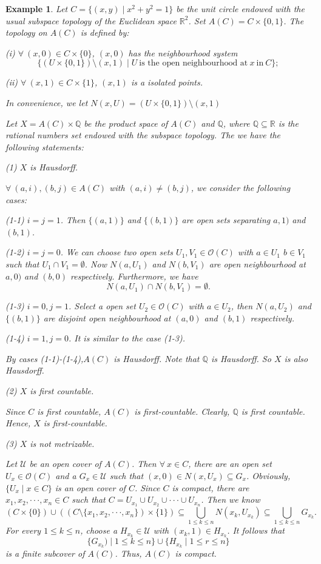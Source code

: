 \documentclass[preprint,12pt]{elsarticle}
\numberwithin{equation}{section}
\newtheorem{example}[theorem]{Example}
\begin{document}
\begin{example} {\rm Let $C=\{(x,y)\mid x^{2}+y^{2}=1\}$ be the unit circle endowed with the usual subspace topology of the Euclidean space $\mathbb{R}^{2}$. Set $A(C)=C\times\{0,1\}$. The topology on $A(C)$ is defined by:

(i) $\forall\ (x,0)\in C\times\{0\}$, $(x,0)$ has the neighbourhood system
$$\{(U\times\{0,1\})\setminus(x,1)\mid U\ \mbox{is the open neighbourhood at}\ x \ \mbox{in}\ C\};$$

(ii) $\forall\ (x,1)\in C\times\{1\}$, $(x,1)$ is a isolated points.

In convenience, we let $N(x,U)=(U\times\{0,1\})\setminus(x,1)$

Let $X=A(C)\times\mathbb{Q}$ be the product space of $A(C)$ and $\mathbb{Q}$, where $\mathbb{Q}\subseteq\mathbb{R}$ is the rational numbers set endowed with the subspace topology. The we have the following statements:

(1) $X$ is Hausdorff.

$\forall\ (a,i),(b,j)\in A(C)$ with $(a,i)\neq(b,j)$, we consider the following cases:

(1-1) $i=j=1$. Then $\{(a,1)\}$ and $\{(b,1)\}$ are open sets separating $a,1)$ and $(b,1)$.

(1-2) $i=j=0$. We can choose two open sets $U_{1},V_{1}\in\mathcal{O}(C)$ with $a\in U_{1}$ $b\in V_{1}$ such that $U_{1}\cap V_{1}=\emptyset$. Now $N(a,U_{1})$ and $N(b,V_{1})$ are open neighbourhood at $a,0)$ and $(b,0)$ respectively. Furthermore, we have $$N(a,U_{1})\cap N(b,V_{1})=\emptyset.$$

(1-3) $i=0,j=1$. Select a open set $U_{2}\in\mathcal{O}(C)$ with $a\in U_{2}$, then $N(a,U_{2})$ and $\{(b,1)\}$ are disjoint open neighbourhood at $(a,0)$ and $(b,1)$ respectively.

(1-4) $i=1,j=0$. It is similar to the case (1-3).

By cases (1-1)-(1-4),$A(C)$ is Hausdorff. Note that $\mathbb{Q}$ is Hausdorff. So $X$ is also Hausdorff.

(2) $X$ is first countable.

Since $C$ is first countable, $A(C)$ is first-countable. Clearly, $\mathbb{Q}$ is first countable. Hence, $X$ is first-countable.

(3) $X$ is not metrizable.

Let $\mathcal{U}$ be an open cover of $A(C)$. Then $\forall\ x\in C$, there are an open set $U_{x}\in\mathcal{O}(C)$ and a $G_{x}\in\mathcal{U}$ such that $(x,0)\in N(x,U_{x})\subseteq G_{x}$. Obviously, $\{U_{x}\mid x\in C\}$ is an open cover of $C$. Since $C$ is compact, there are $x_{1},x_{2},\cdot\cdot\cdot,x_{n}\in C$ such that $C=U_{x_{1}}\cup U_{x_{2}}\cup\cdot\cdot\cdot\cup U_{x_{n}}$. Then we know
$$(C\times\{0\})\cup((C\setminus\{x_{1},x_{2},\cdot\cdot\cdot,x_{n}\})\times\{1\})\subseteq \bigcup\limits_{1\leq k\leq n}N(x_{k},U_{x_{k}})\subseteq \bigcup\limits_{1\leq k\leq n}G_{x_{k}}.$$ For every $1\leq k\leq n$, choose a $H_{x_{k}}\in\mathcal{U}$ with $(x_{k},1)\in H_{x_{k}}$.
It follows that $$\{G_{x_{k}})\mid 1\leq k\leq n\}\cup\{H_{x_{k}}\mid 1\leq r\leq n\}$$ is a finite subcover of $A(C)$. Thus, $A(C)$ is compact.

}
\end{example}
\end{document}
